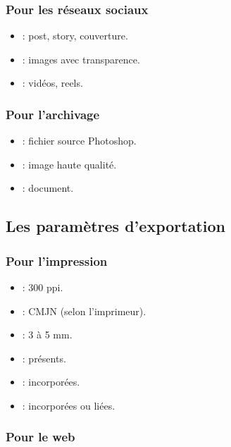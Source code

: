 \subsubsection{Pour les réseaux sociaux}

\begin{itemize}
    \item {} : post, story, couverture.
    \item {} : images avec transparence.
    \item {} : vidéos, reels.
\end{itemize}

\subsubsection{Pour l'archivage}

\begin{itemize}
    \item {} : fichier source Photoshop.
    \item {} : image haute qualité.
    \item {} : document.
\end{itemize}

\subsection{Les paramètres d'exportation}

\subsubsection{Pour l'impression}

\begin{itemize}
    \item {} : 300 ppi.
    \item {} : CMJN (selon l'imprimeur).
    \item {} : 3 à 5 mm.
    \item {} : présents.
    \item {} : incorporées.
    \item {} : incorporées ou liées.
\end{itemize}

\subsubsection{Pour le web}

